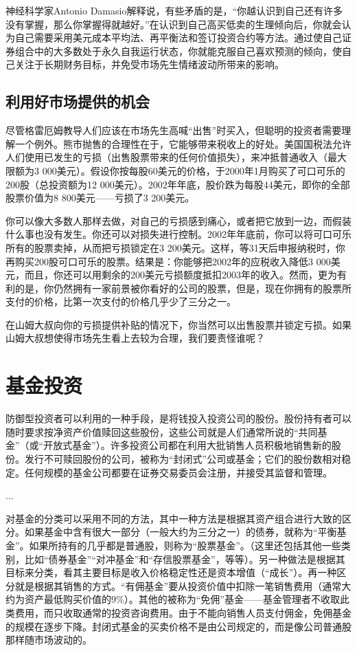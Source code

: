 \documentclass[12pt,oneside]{book}
\begin{document}
神经科学家Antonio Damasio解释说，有些矛盾的是，“你越认识到自己还有许多没有掌握，那么你掌握得就越好。”在认识到自己高买低卖的生理倾向后，你就会认为自己需要采用美元成本平均法、再平衡法和签订投资合约等方法。通过使自己证券组合中的大多数处于永久自我运行状态，你就能克服自己喜欢预测的倾向，使自己关注于长期财务目标，并免受市场先生情绪波动所带来的影响。

\subsection{利用好市场提供的机会}
尽管格雷厄姆教导人们应该在市场先生高喊“出售”时买入，但聪明的投资者需要理解一个例外。熊市抛售的合理性在于，它能够带来税收上的好处。美国国税法允许人们使用已发生的亏损（出售股票带来的任何价值损失），来冲抵普通收入（最大限额为3 000美元）。假设你按每股60美元的价格，于2000年1月购买了可口可乐的200股（总投资额为12 000美元）。2002年年底，股价跌为每股44美元，即你的全部股票价值为8 800美元——亏损了3 200美元。

你可以像大多数人那样去做，对自己的亏损感到痛心，或者把它放到一边，而假装什么事也没有发生。你还可以对损失进行控制。2002年年底前，你可以将可口可乐所有的股票卖掉，从而把亏损锁定在3 200美元。这样，等31天后申报纳税时，你再购买200股可口可乐的股票。结果是：你能够把2002年的应税收入降低3 000美元，而且，你还可以用剩余的200美元亏损额度抵扣2003年的收入。然而，更为有利的是，你仍然拥有一家前景被你看好的公司的股票，但是，现在你拥有的股票所支付的价格，比第一次支付的价格几乎少了三分之一。

在山姆大叔向你的亏损提供补贴的情况下，你当然可以出售股票并锁定亏损。如果山姆大叔想使得市场先生看上去较为合理，我们要责怪谁呢？


\section{基金投资}
防御型投资者可以利用的一种手段，是将钱投入投资公司的股份。股份持有者可以随时要求按净资产价值赎回这些股份，这些公司就是人们通常所说的“共同基金”（或“开放式基金”）。许多投资公司都在利用大批销售人员积极地销售新的股份。发行不可赎回股份的公司，被称为“封闭式”公司或基金；它们的股份数相对稳定。任何规模的基金公司都要在证券交易委员会注册，并接受其监督和管理。

...

对基金的分类可以采用不同的方法，其中一种方法是根据其资产组合进行大致的区分。如果基金中含有很大一部分（一般大约为三分之一）的债券，就称为“平衡基金”。如果所持有的几乎都是普通股，则称为“股票基金”。（这里还包括其他一些类别，比如“债券基金”“对冲基金”和“存信股票基金”，等等）。另一种做法是根据其目标来分类，看其主要目标是收入价格稳定性还是资本增值（“成长”）。再一种区分就是根据其销售的方式。“有佣基金”要从投资价值中扣除一笔销售费用（通常大约为资产最低购买价值的9\%）。其他的被称为“免佣”基金——基金管理者不收取此类费用，而只收取通常的投资咨询费用。由于不能向销售人员支付佣金，免佣基金的规模在逐步下降。封闭式基金的买卖价格不是由公司规定的，而是像公司普通股那样随市场波动的。
\end{document}
